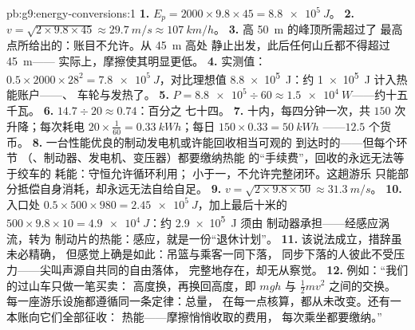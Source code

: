 \begin{solution}{pb:g9:energy-conversions:1}
\textbf{1.} $E_p = 2000 \times 9.8 \times 45 =
\qty{8.8e5}{J}$。
\textbf{2.} $v = \sqrt{2 \times 9.8 \times 45} \approx
\qty{29.7}{m/s} \approx \qty{107}{km/h}$。
\textbf{3.} 高 \qty{50}{m} 的峰顶所需超过了
最高点所给出的：账目不允许。从 \qty{45}{m} 高处
静止出发，此后任何山丘都不得超过 \qty{45}{m}——
实际上，摩擦使其明显更低。
\textbf{4.} 实测值：$0.5 \times 2000 \times 28^2 =
\qty{7.8e5}{J}$，对比理想值 \qty{8.8e5}{J}：约
\qty{1e5}{J} 计入热能账户——、
车轮与发热了。
\textbf{5.} $P = \num{8.8e5} \div 60 \approx
\qty{1.5e4}{W}$——约十五千瓦。
\textbf{6.} $14.7 \div 20 \approx 0.74$：百分之
七十四。
\textbf{7.} 十内，每四分钟一次，共 $150$
次升降；每次耗电 $20 \times \tfrac{1}{60} =
\qty{0.33}{kWh}$；每日 $150 \times 0.33 = \qty{50}{kWh}$
——$12.5$ 个货币。
\textbf{8.} 一台性能优良的制动发电机或许能回收相当可观的
到达时的——但每个环节
（、制动器、发电机、变压器）都要缴纳热能
的“手续费”，回收的永远无法等于绞车的
耗能：守恒允许循环利用；
小于一，不允许完整闭环。这趟游乐
只能部分抵偿自身消耗，却永远无法自给自足。
\textbf{9.} $v = \sqrt{2 \times 9.8 \times 50} \approx
\qty{31.3}{m/s}$。
\textbf{10.} 入口处 $0.5 \times 500 \times 980 =
\qty{2.45e5}{J}$，加上最后十米的 $500 \times 9.8
\times 10 = \qty{4.9e4}{J}$：约 \qty{2.9e5}{J} 须由
制动器承担——经感应涡流，转为
制动片的热能：感应，就是一份“退休计划”。
\textbf{11.} 该说法成立，措辞虽未必精确，
但感觉上确是如此：吊篮与乘客一同下落，
同步下落的人彼此不受压力——尖叫声源自共同的自由落体，
完整地存在，却无从察觉。
\textbf{12.} 例如：“我们的过山车只做一笔买卖：
高度换，再换回高度，即 $m g h$ 与 $\frac12 m v^2$ 之间的交换。
每一座游乐设施都遵循同一条定律：总量，
在每一点核算，都从未改变。还有一本账向它们全部征收：
热能——摩擦悄悄收取的费用，
每次乘坐都要缴纳。”
\end{solution}
